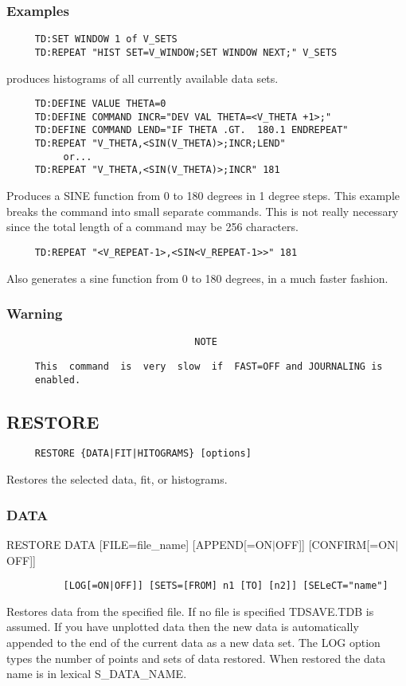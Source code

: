 \subsubsection{Examples}
\begin{verbatim}
     TD:SET WINDOW 1 of V_SETS 
     TD:REPEAT "HIST SET=V_WINDOW;SET WINDOW NEXT;" V_SETS 
\end{verbatim}
produces histograms of all currently available data sets.  
\begin{verbatim}
     TD:DEFINE VALUE THETA=0 
     TD:DEFINE COMMAND INCR="DEV VAL THETA=<V_THETA +1>;" 
     TD:DEFINE COMMAND LEND="IF THETA .GT.  180.1 ENDREPEAT" 
     TD:REPEAT "V_THETA,<SIN(V_THETA)>;INCR;LEND" 
          or...  
     TD:REPEAT "V_THETA,<SIN(V_THETA)>;INCR" 181 
\end{verbatim}
Produces a SINE function from 0 to 180 degrees in 1 degree steps.  This
example breaks the command into small separate commands.  This  is  not
really  necessary  since  the  total  length  of  a  command may be 256
characters.  
\begin{verbatim}
     TD:REPEAT "<V_REPEAT-1>,<SIN<V_REPEAT-1>>" 181 
\end{verbatim}
Also  generates a sine function from 0 to 180 degrees, in a much faster
fashion.  
\subsubsection{Warning}


\begin{verbatim}
                                 NOTE
\end{verbatim}

\begin{verbatim}
     This  command  is  very  slow  if  FAST=OFF and JOURNALING is
     enabled.  
\end{verbatim}


\subsection{RESTORE}
\begin{verbatim}
     RESTORE {DATA|FIT|HITOGRAMS} [options] 
\end{verbatim}
Restores the selected data, fit, or histograms.  
\subsubsection{DATA}
RESTORE   DATA  [FILE=file\_name]  [APPEND[=ON$|$OFF]]  [CONFIRM[=ON$|$OFF]]
\begin{verbatim}
          [LOG[=ON|OFF]] [SETS=[FROM] n1 [TO] [n2]] [SELeCT="name"] 
\end{verbatim}
Restores  data  from  the  specified  file.   If  no  file is specified
TDSAVE.TDB is assumed.  If you have unplotted data then the new data is
automatically  appended  to  the  end of the current data as a new data
set.  The LOG option types the  number  of  points  and  sets  of  data
restored.  When restored the data name is in lexical S\_DATA\_NAME.  
